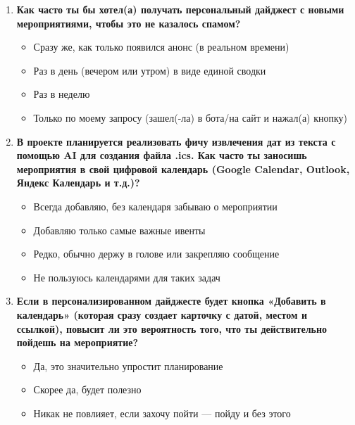 \begin{enumerate}
    \vspace{1em}

    \item \textbf{Как часто ты бы хотел(а) получать персональный дайджест с новыми мероприятиями, чтобы это не казалось спамом?}
    \begin{itemize}
        \item[$\bigcirc$] Сразу же, как только появился анонс (в реальном времени)
        \item[$\bigcirc$] Раз в день (вечером или утром) в виде единой сводки
        \item[$\bigcirc$] Раз в неделю
        \item[$\bigcirc$] Только по моему запросу (зашел(-ла) в бота/на сайт и нажал(а) кнопку)
    \end{itemize}

    \vspace{1em}

    \item \textbf{В проекте планируется реализовать фичу извлечения дат из текста с помощью AI для создания файла .ics. Как часто ты заносишь мероприятия в свой цифровой календарь (Google Calendar, Outlook, Яндекс Календарь и т.д.)?}
    \begin{itemize}
        \item[$\bigcirc$] Всегда добавляю, без календаря забываю о мероприятии
        \item[$\bigcirc$] Добавляю только самые важные ивенты
        \item[$\bigcirc$] Редко, обычно держу в голове или закрепляю сообщение
        \item[$\bigcirc$] Не пользуюсь календарями для таких задач
    \end{itemize}

    \vspace{1em}

    \item \textbf{Если в персонализированном дайджесте будет кнопка «Добавить в календарь» (которая сразу создает карточку с датой, местом и ссылкой), повысит ли это вероятность того, что ты действительно пойдешь на мероприятие?}
    \begin{itemize}
        \item[$\bigcirc$] Да, это значительно упростит планирование
        \item[$\bigcirc$] Скорее да, будет полезно
        \item[$\bigcirc$] Никак не повлияет, если захочу пойти --- пойду и без этого
    \end{itemize}


\end{enumerate}
